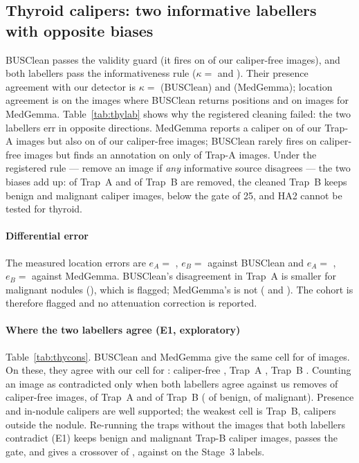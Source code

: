 \subsection{Thyroid calipers: two informative labellers with opposite biases}
BUSClean passes the validity guard (it fires on \sEightBusFreePos{} of our caliper-free images), and both labellers pass
the informativeness rule ($\kappa=$ \sEightBusInf{} and \sEightMgInf). Their presence agreement with our detector is
$\kappa=$ \sEightBusKappa{} (BUSClean) and \sEightMgKappa{} (MedGemma); location agreement is \sEightBusLoc{} on the
\sEightNBusLoc{} images where BUSClean returns positions and \sEightMgLoc{} on \sEightNMgLoc{} images for MedGemma.
Table~\ref{tab:thylab} shows why the registered cleaning failed: the two labellers err in opposite directions. MedGemma
reports a caliper on \sEightMgYestrapA{} of our Trap-A images but also on \sEightMgYesartifactfree{} of our caliper-free
images; BUSClean rarely fires on caliper-free images but finds an annotation on only \sEightBusYestrapA{} of Trap-A images.
Under the registered rule --- remove an image if \emph{any} informative source disagrees --- the two biases add up:
\sEightContratrapA{} of Trap~A and \sEightContratrapB{} of Trap~B are removed, the cleaned Trap~B keeps \sEightGateBYZero{}
benign and \sEightGateBYOne{} malignant caliper images, below the gate of 25, and HA2 cannot be tested for thyroid.

\paragraph{Differential error} The measured location errors are $e_A=$ \sEightBuseA, $e_B=$ \sEightBuseB{} against BUSClean
and $e_A=$ \sEightMgeA, $e_B=$ \sEightMgeB{} against MedGemma. BUSClean's disagreement in Trap~A is smaller for malignant
nodules (\sEightBusDiffA), which is flagged; MedGemma's is not (\sEightMgDiffA{} and \sEightMgDiffB). The cohort is
therefore flagged and no attenuation correction is reported.
\paragraph{Where the two labellers agree (E1, exploratory)} Table~\ref{tab:thycons}. BUSClean and MedGemma give the same
cell for \sEightNBoth{} of \sEightNCells{} images. On these, they agree with our cell for \sEightBothAgree: caliper-free
\sEightConsAgreeartifactfree, Trap~A \sEightConsAgreetrapA, Trap~B \sEightConsAgreetrapB. Counting an image as
contradicted only when both labellers agree against us removes \sEightConsContraartifactfree{} of caliper-free images,
\sEightConsContratrapA{} of Trap~A and \sEightConsContratrapB{} of Trap~B (\sEightConsContraBYZero{} of benign,
\sEightConsContraBYOne{} of malignant). Presence and in-nodule calipers are well supported; the weakest cell is Trap~B,
calipers outside the nodule. Re-running the traps without the images that both labellers contradict (E1) keeps
\sEightEoneBYZero{} benign and \sEightEoneBYOne{} malignant Trap-B caliper images, passes the gate, and gives a crossover of
\sEightEoneCross, against \sEightOrigthyroid{} on the Stage~3 labels.

